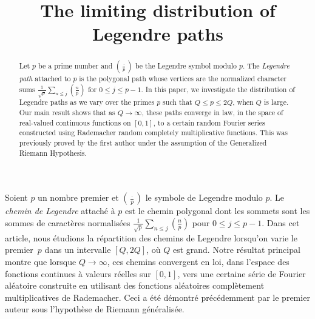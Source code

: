 \documentclass[JEP,XML,SOM,Unicode,NoFloatCountersInSection,published]{cedram}
\theoremstyle{plain}
\theoremstyle{definition}
\begin{document}
\title{The limiting distribution of Legendre paths}

\author[\initial{A.} \lastname{Hussain}]{ }
\address{Department of Mathematics,
University of Exeter\\
North Park Road,
Exeter,
EX4 4QF,
U.K.}

\author[\initial{Y.} \lastname{Lamzouri}]{ }
\address{Université de Lorraine, CNRS, IECL, and Institut Universitaire de France\\
F-54000 Nancy, France}

\begin{abstract}
Let $p$ be a prime number and
$(\frac{\cdot}{p})$ be the Legendre symbol modulo $p$. The \emph{Legendre path} attached to $p$ is the polygonal path whose vertices are the normalized character sums $\frac{1}{\sqrt{p}} \sum_{n\leq j}(\frac{n}{p})$ for $0\leq j\leq p-1$. In this paper, we investigate the distribution of Legendre paths as we vary over the primes $p$ such that $Q\leq p\leq 2Q$, when $Q$ is large. Our main result shows that as $Q \to \infty$, these paths converge in law, in the space of real-valued continuous functions on $[0, 1]$, to a certain random Fourier series constructed using Rademacher random completely multiplicative functions. This was previously proved by the first author under the assumption of the Generalized Riemann Hypothesis.
\end{abstract}





\begin{altabstract}
Soient $p$ un nombre premier et
$(\frac{\cdot}{p})$ le symbole de Legendre modulo $p$. Le \emph{chemin de Legendre} attaché à $p$ est le chemin polygonal dont les sommets sont les sommes de caractères normalisées $\frac{1}{\sqrt{p}} \sum_{n\leq j}(\frac{n}{p})$ pour \hbox{$0\leq j\leq p-1$}. Dans cet article, nous étudions la répartition des chemins de Legendre lorsqu'on varie le premier~$p$ dans un intervalle $[Q, 2Q]$, où $Q$ est grand. Notre résultat principal montre que lorsque \hbox{$Q \to \infty$}, ces chemins convergent en loi, dans l'espace des fonctions continues à valeurs réelles sur $[0, 1]$, vers une certaine série de Fourier aléatoire construite en utilisant des fonctions aléatoires complètement multiplicatives de Rademacher. Ceci a été démontré précédemment par le premier auteur sous l'hypothèse de Riemann généralisée.
\end{altabstract}
\end{document}
